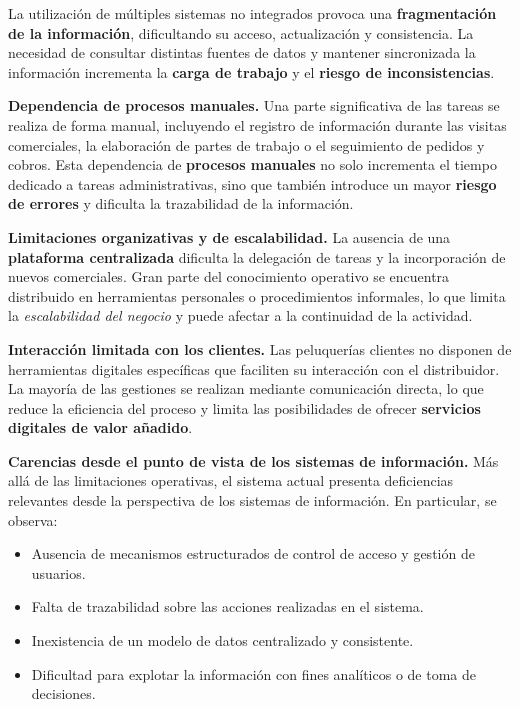 La utilización de múltiples sistemas no integrados provoca una \textbf{fragmentación de la información}, dificultando su acceso, actualización y consistencia. La necesidad de consultar distintas fuentes de datos y mantener sincronizada la información incrementa la \textbf{carga de trabajo} y el \textbf{riesgo de inconsistencias}.

\noindent\textbf{Dependencia de procesos manuales.} Una parte significativa de las tareas se realiza de forma manual, incluyendo el registro de información durante las visitas comerciales, la elaboración de partes de trabajo o el seguimiento de pedidos y cobros. Esta dependencia de \textbf{procesos manuales} no solo incrementa el tiempo dedicado a tareas administrativas, sino que también introduce un mayor \textbf{riesgo de errores} y dificulta la trazabilidad de la información.

\noindent\textbf{Limitaciones organizativas y de escalabilidad.} La ausencia de una \textbf{plataforma centralizada} dificulta la delegación de tareas y la incorporación de nuevos comerciales. Gran parte del conocimiento operativo se encuentra distribuido en herramientas personales o procedimientos informales, lo que limita la \textit{escalabilidad del negocio} y puede afectar a la continuidad de la actividad.

\noindent\textbf{Interacción limitada con los clientes.} Las peluquerías clientes no disponen de herramientas digitales específicas que faciliten su interacción con el distribuidor. La mayoría de las gestiones se realizan mediante comunicación directa, lo que reduce la eficiencia del proceso y limita las posibilidades de ofrecer \textbf{servicios digitales de valor añadido}.

\noindent\textbf{Carencias desde el punto de vista de los sistemas de información.} Más allá de las limitaciones operativas, el sistema actual presenta deficiencias relevantes desde la perspectiva de los sistemas de información. En particular, se observa:

\begin{itemize}[topsep=0.2em, itemsep=0.1em]
  \item Ausencia de mecanismos estructurados de control de acceso y gestión de usuarios.
  \item Falta de trazabilidad sobre las acciones realizadas en el sistema.
  \item Inexistencia de un modelo de datos centralizado y consistente.
  \item Dificultad para explotar la información con fines analíticos o de toma de decisiones.
\end{itemize}

